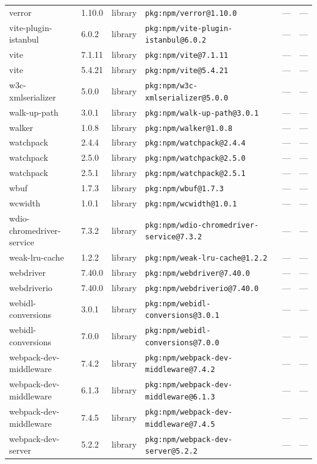 \documentclass[11pt]{article}
\begin{document}
\begin{longtable}{|l|l|l|p{2.2cm}|l|p{4cm}|}
verror & 1.10.0 & library & \texttt{pkg:npm/verror@1.10.0} & — & — \\
vite-plugin-istanbul & 6.0.2 & library & \texttt{pkg:npm/vite-plugin-istanbul@6.0.2} & — & — \\
vite & 7.1.11 & library & \texttt{pkg:npm/vite@7.1.11} & — & — \\
vite & 5.4.21 & library & \texttt{pkg:npm/vite@5.4.21} & — & — \\
w3c-xmlserializer & 5.0.0 & library & \texttt{pkg:npm/w3c-xmlserializer@5.0.0} & — & — \\
walk-up-path & 3.0.1 & library & \texttt{pkg:npm/walk-up-path@3.0.1} & — & — \\
walker & 1.0.8 & library & \texttt{pkg:npm/walker@1.0.8} & — & — \\
watchpack & 2.4.4 & library & \texttt{pkg:npm/watchpack@2.4.4} & — & — \\
watchpack & 2.5.0 & library & \texttt{pkg:npm/watchpack@2.5.0} & — & — \\
watchpack & 2.5.1 & library & \texttt{pkg:npm/watchpack@2.5.1} & — & — \\
wbuf & 1.7.3 & library & \texttt{pkg:npm/wbuf@1.7.3} & — & — \\
wcwidth & 1.0.1 & library & \texttt{pkg:npm/wcwidth@1.0.1} & — & — \\
wdio-chromedriver-service & 7.3.2 & library & \texttt{pkg:npm/wdio-chromedriver-service@7.3.2} & — & — \\
weak-lru-cache & 1.2.2 & library & \texttt{pkg:npm/weak-lru-cache@1.2.2} & — & — \\
webdriver & 7.40.0 & library & \texttt{pkg:npm/webdriver@7.40.0} & — & — \\
webdriverio & 7.40.0 & library & \texttt{pkg:npm/webdriverio@7.40.0} & — & — \\
webidl-conversions & 3.0.1 & library & \texttt{pkg:npm/webidl-conversions@3.0.1} & — & — \\
webidl-conversions & 7.0.0 & library & \texttt{pkg:npm/webidl-conversions@7.0.0} & — & — \\
webpack-dev-middleware & 7.4.2 & library & \texttt{pkg:npm/webpack-dev-middleware@7.4.2} & — & — \\
webpack-dev-middleware & 6.1.3 & library & \texttt{pkg:npm/webpack-dev-middleware@6.1.3} & — & — \\
webpack-dev-middleware & 7.4.5 & library & \texttt{pkg:npm/webpack-dev-middleware@7.4.5} & — & — \\
webpack-dev-server & 5.2.2 & library & \texttt{pkg:npm/webpack-dev-server@5.2.2} & — & — \\

\end{longtable}
\end{document}
